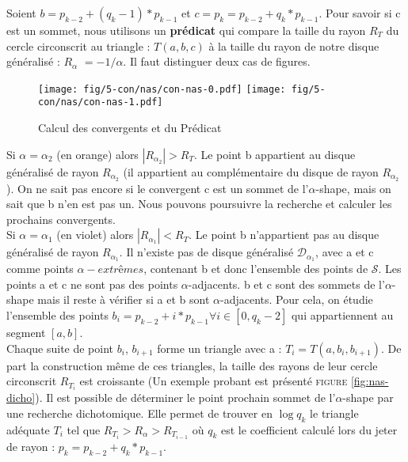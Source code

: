 Soient  $b = p_{k-2} + (q_k - 1) * p_{k-1}$ et $c = p_k = p_{k-2} + q_k * p_{k-1}$. Pour savoir si c est un sommet, nous utilisons un \textbf{prédicat} qui compare la taille du rayon \textbf{$R_T$} du cercle circonscrit au triangle : $T(a, b, c)$ à la taille du rayon de notre disque généralisé : \textbf{$R_{\alpha}$} $= -1/\alpha$. Il faut distinguer deux cas de figures.\\

\begin{figure}[H]
  \centering
  \texttt{[image: fig/5-con/nas/con-nas-0.pdf]}
  \texttt{[image: fig/5-con/nas/con-nas-1.pdf]}
  \caption{Calcul des convergents et du Prédicat}
  \label{fig:nas1}
\end{figure}

Si $\alpha = \alpha_{2}$ (en orange) alors \textbf{$|R_{\alpha_{2}}| > R_T$}. Le point b appartient au disque généralisé de rayon $R_{\alpha_{2}}$ (il appartient au complémentaire du disque de rayon $R_{\alpha_{2}}$). On ne sait pas encore si le convergent c est un sommet de l'$\alpha$-shape, mais on sait que b n'en est pas un. Nous pouvons poursuivre la recherche et calculer les prochains convergents.\\

Si $\alpha = \alpha_{1}$ (en violet) alors \textbf{$|R_{\alpha_{1}}| < R_T$}. Le point b n'appartient pas au disque généralisé de rayon $R_{\alpha_{1}}$. Il n'existe pas de disque généralisé $\mathcal{D}_{\alpha_1}$, avec a et c comme points $\alpha-extrêmes$, contenant b et donc l'ensemble des points de $\mathcal{S}$. Les points a et c ne sont pas des points $\alpha$-adjacents. b et c sont des sommets de l'$\alpha$-shape mais il reste à vérifier si a et b sont $\alpha$-adjacents. Pour cela, on étudie l'ensemble des points  $b_i = p_{k-2} + i*p_{k-1} \forall i \in [0, q_k-2]$ qui appartiennent au segment $[a,b]$.\\

Chaque suite de point $b_i$, $b_{i+1}$ forme un triangle avec a : $T_i = T(a, b_{i}, b_{i+1})$. De part la construction même de ces triangles, la taille des rayons de leur cercle circonscrit $R_{T_{i}}$ est croissante (Un exemple probant est présenté \textsc{figure} \ref{fig:nas-dicho}). Il est possible de déterminer le point prochain sommet de l'$\alpha$-shape par une recherche dichotomique. Elle permet de trouver en $\log q_k$ le triangle adéquate $T_i$ tel que $R_{T_{i}} > R_{\alpha} > R_{T_{i-1}}$ où $q_k$ est le coefficient calculé lors du jeter de rayon : $p_k = p_{k-2} + q_k * p_{k-1}$.

